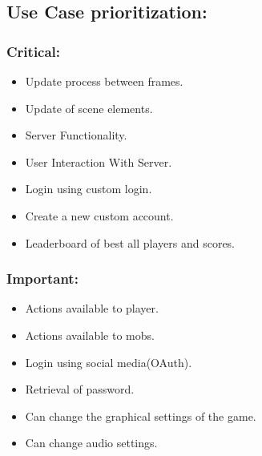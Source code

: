 \documentclass[letterpaper]{article}
\begin{document}
			\vspace{0.2in}
			\subsection*{Use Case prioritization:}
			\vspace{0.1in}
					
				\subsubsection*{Critical:}
				\vspace{0.1in}
					
					\begin{itemize}
						\item Update process between frames.
						\item Update of scene elements.
						\item Server Functionality.
						\item User Interaction With Server.
						\item Login using custom login.
						\item Create a new custom account.	
						\item Leaderboard of best all players and scores.					
					\end{itemize}	
					
				\vspace{0.2in}
				\subsubsection*{Important:}
				\vspace{0.2in}
				
					\begin{itemize}
						\item Actions available to player.
						\item Actions available to mobs.
						\item Login using social media(OAuth).
						\item Retrieval of password.
						\item Can change the graphical settings of the game.
						\item Can change audio settings.
					\end{itemize}
				
\end{document}
